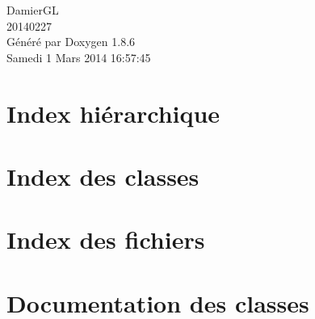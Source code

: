 \documentclass[twoside]{book}
\newcommand{\clearemptydoublepage}{%
  \newpage{\pagestyle{empty}\cleardoublepage}%
}
\begin{document}
\hypersetup{pageanchor=false}
\begin{titlepage}
\vspace*{7cm}
\begin{center}%
{\Large Damier\-G\-L \\[1ex]\large 20140227 }\\
\vspace*{1cm}
{\large Généré par Doxygen 1.8.6}\\
\vspace*{0.5cm}
{\small Samedi 1 Mars 2014 16:57:45}\\
\end{center}
\end{titlepage}
\clearemptydoublepage
\tableofcontents
\clearemptydoublepage
{}
\hypersetup{pageanchor=true}

\chapter{Index hiérarchique}

\chapter{Index des classes}

\chapter{Index des fichiers}

\chapter{Documentation des classes}























\end{document}
